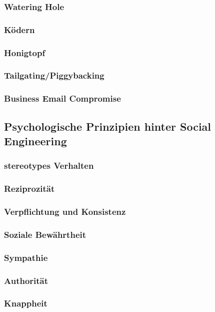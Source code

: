 \subsubsection{Watering Hole}
\subsubsection{Ködern}
\subsubsection{Honigtopf}
\subsubsection{Tailgating/Piggybacking}
\subsubsection{Business Email Compromise}

\subsection{Psychologische Prinzipien hinter Social Engineering}

\subsubsection{stereotypes Verhalten}
\subsubsection{Reziprozität}
\subsubsection{Verpflichtung und Konsistenz}
\subsubsection{Soziale Bewährtheit}
\subsubsection{Sympathie}
\subsubsection{Authorität}
\subsubsection{Knappheit}



